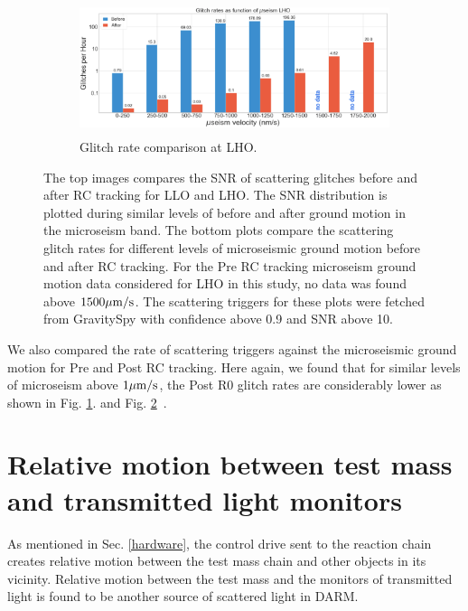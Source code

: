 \documentclass[12pt]{iopart}
\begin{document}
\begin{figure}[h]
\begin{subfigure}[b]{0.45\textwidth}
         \label{fig:rate_LLO}
    \end{subfigure}
    \hfill
    \begin{subfigure}[b]{0.45\textwidth}
        \centering
         \includegraphics[width =\textwidth,height=3.9cm]{glitch_rateLHO.png}
         \caption{Glitch rate comparison at LHO.}
         \label{fig:rate_LHO}
    \end{subfigure}
    
    
    
    \caption{The top images compares the SNR of scattering glitches before and after RC tracking for LLO and LHO. The  SNR distribution is plotted during similar levels of before and after ground motion in the microseism band. The bottom plots compare the scattering glitch rates for different levels of microseismic ground motion before and after RC tracking. For the Pre RC tracking microseism ground motion data considered for LHO in this study, no data was found above $1500\mu{\rm m/s}$. The scattering triggers for these plots were fetched from GravitySpy with confidence above 0.9 and SNR above 10.} %
    \label{fig:postr0_scat}
    
\end{figure}
We also compared the rate of scattering triggers against the microseismic ground motion for Pre and Post RC tracking. Here again, we found that for similar levels of microseism above $1\mu{\rm m/s}$, the Post R0 glitch rates are considerably lower as shown in Fig. \ref{fig:rate_LLO}. and Fig. \ref{fig:rate_LHO}~\cite{alog_corey}.


\section{Relative motion between test mass and transmitted light monitors} \label{transmon_scattering}
As mentioned in Sec. \ref{hardware}, the control drive sent to the reaction chain creates relative motion between the test mass chain and other objects in its vicinity. Relative motion between the test mass and the monitors of transmitted light is found to be another source of scattered light in DARM.
\par
 
\end{document}
